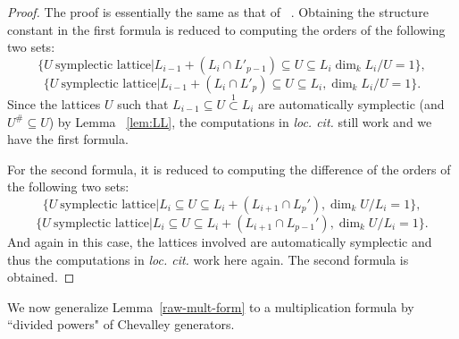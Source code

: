 \documentclass[12pt,reqno]{amsart}
\numberwithin{equation}{section}
\theoremstyle{definition}
\theoremstyle{plain}
\begin{document}
\begin{proof}
The proof is essentially the same as that of ~\cite[Proposition 3.5]{Lu99}.  
Obtaining the structure constant in the first formula is reduced to computing the orders of the following two sets:
\[
\{ U \ \mbox{symplectic lattice}  | L_{i-1} + (L_i \cap L'_{p-1}) \subseteq U \subseteq L_i  \dim_k L_i / U =1\},
\]
\[
\{  U \ \mbox{symplectic lattice}  | L_{i-1} + (L_i \cap L'_{p}) \subseteq U \subseteq L_i , \dim_k L_i / U =1\}.
\]
Since the lattices $U$ such that $L_{i-1} \subseteq U \overset{1}{\subset} L_i$ 
are automatically symplectic (and $U^{\#} \subseteq U$) by Lemma ~\ref{lem:LL},
 the computations in {\em loc. cit.} still work and we have the first formula.

For the second formula, it is reduced to computing the difference of the orders of the following two sets:
\[
\{ U \ \mbox{symplectic lattice}  \vert  L_{i} \subseteq U \subseteq L_i + (L_{i+1} \cap L_p') , \dim_k U/L_i =1\}, 
\]
\[
\{ U \ \mbox{symplectic lattice}  \vert  L_{i} \subseteq U \subseteq L_i + (L_{i+1} \cap L_{p-1}') , \dim_k U/L_i =1\}.
\]
And again in this case, the lattices involved are automatically symplectic and thus the computations in {\it loc. cit.}   work here again. The second formula is obtained.
\end{proof}

We now generalize Lemma~\ref{raw-mult-form} to a multiplication formula by ``divided powers" of Chevalley generators. 
\end{document}

